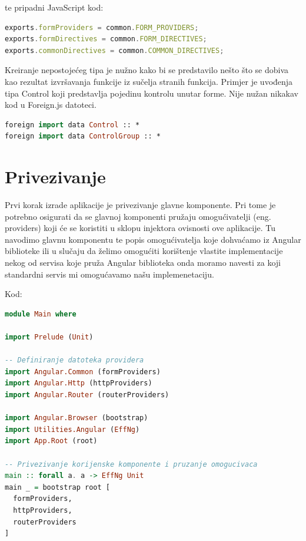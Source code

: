 \documentclass[times, utf8, zavrsni]{fer}
\begin{document}
te  pripadni JavaScript kod:

\begin{lstlisting}[language=JavaScript, basicstyle=\small\linespread{0.8}]
exports.formProviders = common.FORM_PROVIDERS;
exports.formDirectives = common.FORM_DIRECTIVES;
exports.commonDirectives = common.COMMON_DIRECTIVES;
\end{lstlisting}

Kreiranje nepostojećeg tipa je nužno kako bi se predstavilo nešto što se dobiva kao rezultat izvršavanja funkcije iz sučelja stranih funkcija. Primjer je uvođenja tipa Control koji predstavlja pojedinu kontrolu unutar forme. Nije nužan nikakav kod u Foreign.js datoteci.

\begin{lstlisting}[language=PureScript, basicstyle=\small\linespread{0.8}]
foreign import data Control :: *
foreign import data ControlGroup :: *
\end{lstlisting}

\section{Privezivanje}
Prvi korak izrade aplikacije je privezivanje glavne komponente. Pri tome je potrebno osigurati da se glavnoj komponenti pružaju omogućivatelji (eng. providers) koji će se koristiti u sklopu injektora ovisnosti ove aplikacije. Tu navodimo glavnu komponentu te popis omogućivatelja koje dohvaćamo iz Angular biblioteke ili u slučaju da želimo omogućiti korištenje vlastite implementacije nekog od servisa koje pruža Angular biblioteka onda moramo navesti za koji standardni servis mi omogućavamo našu implemenetaciju.

Kod:

\begin{lstlisting}[language=PureScript, basicstyle=\small\linespread{0.8}]
module Main where

import Prelude (Unit)

-- Definiranje datoteka providera
import Angular.Common (formProviders)
import Angular.Http (httpProviders)
import Angular.Router (routerProviders)

import Angular.Browser (bootstrap)
import Utilities.Angular (EffNg)
import App.Root (root)

-- Privezivanje korijenske komponente i pruzanje omogucivaca
main :: forall a. a -> EffNg Unit
main _ = bootstrap root [
  formProviders,
  httpProviders,
  routerProviders
]
\end{lstlisting}
\end{document}

